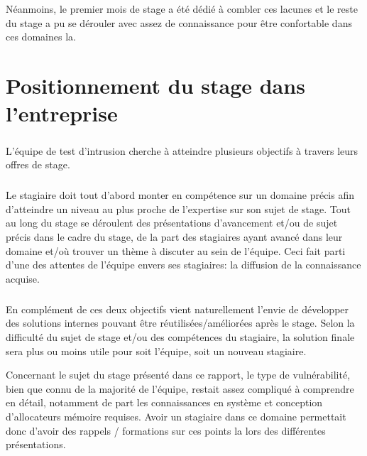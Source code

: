 Néanmoins, le premier mois de stage a été dédié à combler ces lacunes et le reste du stage a pu se dérouler avec assez de connaissance
pour être confortable dans ces domaines la.

\subparagraph{}


\section*{Positionnement du stage dans l'entreprise}
\paragraph{}
\subparagraph{}
L'équipe de test d'intrusion cherche à atteindre plusieurs objectifs à travers leurs offres de stage.
\subparagraph{}
Le stagiaire doit tout d'abord monter en compétence sur un domaine précis afin d'atteindre un niveau au plus proche de l'expertise sur son sujet de stage.\newline
Tout au long du stage se déroulent des présentations d'avancement et/ou de sujet précis dans le cadre du stage, de la part des stagiaires ayant avancé dans leur domaine et/où trouver un thème à discuter au sein de l'équipe. Ceci fait parti d'une des attentes de l'équipe envers ses stagiaires: la diffusion de la connaissance acquise.
\subparagraph{}
En complément de ces deux objectifs vient naturellement l'envie de développer des solutions internes pouvant être réutilisées/améliorées après le stage. Selon la difficulté du sujet de stage
et/ou des compétences du stagiaire, la solution finale sera plus ou moins utile pour soit l'équipe, soit un nouveau stagiaire.\newline

Concernant le sujet du stage présenté dans ce rapport, le type de vulnérabilité, bien que connu de la majorité de l'équipe, restait assez compliqué à comprendre en détail,
notamment de part les connaissances en système et conception d'allocateurs mémoire requises. Avoir un stagiaire dans ce domaine permettait donc d'avoir des
rappels / formations sur ces points la lors des différentes présentations.
